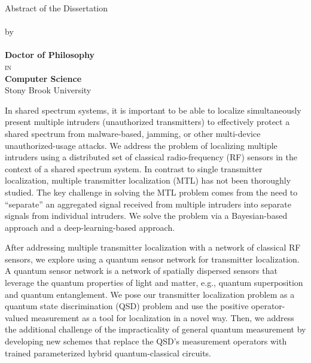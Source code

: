 \begin{center}
    Abstract of the Dissertation  \\
    \vspace{0.25cm}
    \textbf{\ttitle}  \\
    \vspace{0.25cm}
    by    \\
    \vspace{0.25cm}
    \textbf{\authorname}  \\
    \vspace{0.25cm}
    \textbf{Doctor of Philosophy}  \\
    \vspace{0.25cm}
    \textsc{in}  \\
    \vspace{0.25cm}
    \textbf{Computer Science}   \\
    \vspace{0.25cm}
    Stony Brook University    \\
\end{center}

In shared spectrum systems, it is important to be able to localize simultaneously present multiple intruders 
(unauthorized transmitters) to effectively protect a shared spectrum from malware-based, jamming, 
or other multi-device unauthorized-usage attacks. We address the problem of localizing multiple intruders using 
a distributed set of classical radio-frequency (RF) sensors in the context of a shared spectrum system. 
In contrast to single transmitter localization, multiple transmitter localization (MTL) has not been thoroughly studied. 
The key challenge in solving the MTL problem comes from the need to “separate” an aggregated signal received from 
multiple intruders into separate signals from individual intruders. We solve the problem via a Bayesian-based approach 
and a deep-learning-based approach. 

After addressing multiple transmitter localization with a network of classical RF sensors, 
we explore using a quantum sensor network for transmitter localization. 
A quantum sensor network is a network of spatially dispersed sensors that leverage the quantum properties of light and matter, 
e.g., quantum superposition and quantum entanglement. We pose our transmitter localization problem as 
a quantum state discrimination (QSD) problem and use the positive operator-valued measurement as a tool 
for localization in a novel way. Then, we address the additional challenge of the impracticality 
of general quantum measurement by developing new schemes that replace the QSD’s measurement operators 
with trained parameterized hybrid quantum-classical circuits. 

